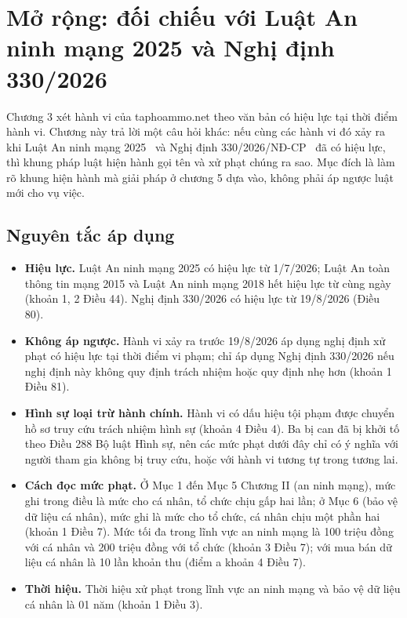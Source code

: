 \section{Mở rộng: đối chiếu với Luật An ninh mạng 2025 và Nghị định 330/2026}\label{sec:7}

Chương 3 xét hành vi của taphoammo.net theo văn bản có hiệu lực tại thời điểm hành vi. Chương này trả lời một câu hỏi khác: nếu cùng các hành vi đó xảy ra khi Luật An ninh mạng 2025~\cite{luat-anm-2025} và Nghị định 330/2026/NĐ-CP~\cite{nd330-2026} đã có hiệu lực, thì khung pháp luật hiện hành gọi tên và xử phạt chúng ra sao. Mục đích là làm rõ khung hiện hành mà giải pháp ở chương 5 dựa vào, không phải áp ngược luật mới cho vụ việc.

\subsection{Nguyên tắc áp dụng}\label{sec:7.1}

\begin{itemize}
\item \textbf{Hiệu lực.} Luật An ninh mạng 2025 có hiệu lực từ 1/7/2026; Luật An toàn thông tin mạng 2015 và Luật An ninh mạng 2018 hết hiệu lực từ cùng ngày (khoản 1, 2 Điều 44). Nghị định 330/2026 có hiệu lực từ 19/8/2026 (Điều 80).
\item \textbf{Không áp ngược.} Hành vi xảy ra trước 19/8/2026 áp dụng nghị định xử phạt có hiệu lực tại thời điểm vi phạm; chỉ áp dụng Nghị định 330/2026 nếu nghị định này không quy định trách nhiệm hoặc quy định nhẹ hơn (khoản 1 Điều 81).
\item \textbf{Hình sự loại trừ hành chính.} Hành vi có dấu hiệu tội phạm được chuyển hồ sơ truy cứu trách nhiệm hình sự (khoản 4 Điều 4). Ba bị can đã bị khởi tố theo Điều 288 Bộ luật Hình sự, nên các mức phạt dưới đây chỉ có ý nghĩa với người tham gia không bị truy cứu, hoặc với hành vi tương tự trong tương lai.
\item \textbf{Cách đọc mức phạt.} Ở Mục 1 đến Mục 5 Chương II (an ninh mạng), mức ghi trong điều là mức cho cá nhân, tổ chức chịu gấp hai lần; ở Mục 6 (bảo vệ dữ liệu cá nhân), mức ghi là mức cho tổ chức, cá nhân chịu một phần hai (khoản 1 Điều 7). Mức tối đa trong lĩnh vực an ninh mạng là 100 triệu đồng với cá nhân và 200 triệu đồng với tổ chức (khoản 3 Điều 7); với mua bán dữ liệu cá nhân là 10 lần khoản thu (điểm a khoản 4 Điều 7).
\item \textbf{Thời hiệu.} Thời hiệu xử phạt trong lĩnh vực an ninh mạng và bảo vệ dữ liệu cá nhân là 01 năm (khoản 1 Điều 3).
\end{itemize}

